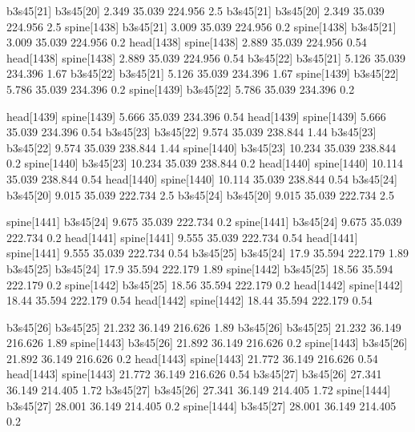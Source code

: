 b3s45[21]    b3s45[20]    2.349    35.039    224.956    2.5
b3s45[21]    b3s45[20]    2.349    35.039    224.956    2.5
spine[1438]    b3s45[21]    3.009    35.039    224.956    0.2
spine[1438]    b3s45[21]    3.009    35.039    224.956    0.2
head[1438]    spine[1438]    2.889    35.039    224.956    0.54
head[1438]    spine[1438]    2.889    35.039    224.956    0.54
b3s45[22]    b3s45[21]    5.126    35.039    234.396    1.67
b3s45[22]    b3s45[21]    5.126    35.039    234.396    1.67
spine[1439]    b3s45[22]    5.786    35.039    234.396    0.2
spine[1439]    b3s45[22]    5.786    35.039    234.396    0.2


head[1439]    spine[1439]    5.666    35.039    234.396    0.54
head[1439]    spine[1439]    5.666    35.039    234.396    0.54
b3s45[23]    b3s45[22]    9.574    35.039    238.844    1.44
b3s45[23]    b3s45[22]    9.574    35.039    238.844    1.44
spine[1440]    b3s45[23]    10.234    35.039    238.844    0.2
spine[1440]    b3s45[23]    10.234    35.039    238.844    0.2
head[1440]    spine[1440]    10.114    35.039    238.844    0.54
head[1440]    spine[1440]    10.114    35.039    238.844    0.54
b3s45[24]    b3s45[20]    9.015    35.039    222.734    2.5
b3s45[24]    b3s45[20]    9.015    35.039    222.734    2.5


spine[1441]    b3s45[24]    9.675    35.039    222.734    0.2
spine[1441]    b3s45[24]    9.675    35.039    222.734    0.2
head[1441]    spine[1441]    9.555    35.039    222.734    0.54
head[1441]    spine[1441]    9.555    35.039    222.734    0.54
b3s45[25]    b3s45[24]    17.9    35.594    222.179    1.89
b3s45[25]    b3s45[24]    17.9    35.594    222.179    1.89
spine[1442]    b3s45[25]    18.56    35.594    222.179    0.2
spine[1442]    b3s45[25]    18.56    35.594    222.179    0.2
head[1442]    spine[1442]    18.44    35.594    222.179    0.54
head[1442]    spine[1442]    18.44    35.594    222.179    0.54


b3s45[26]    b3s45[25]    21.232    36.149    216.626    1.89
b3s45[26]    b3s45[25]    21.232    36.149    216.626    1.89
spine[1443]    b3s45[26]    21.892    36.149    216.626    0.2
spine[1443]    b3s45[26]    21.892    36.149    216.626    0.2
head[1443]    spine[1443]    21.772    36.149    216.626    0.54
head[1443]    spine[1443]    21.772    36.149    216.626    0.54
b3s45[27]    b3s45[26]    27.341    36.149    214.405    1.72
b3s45[27]    b3s45[26]    27.341    36.149    214.405    1.72
spine[1444]    b3s45[27]    28.001    36.149    214.405    0.2
spine[1444]    b3s45[27]    28.001    36.149    214.405    0.2


